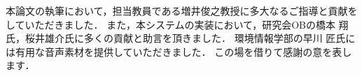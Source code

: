 \begin{acknowledgment}

本論文の執筆において，担当教員である増井俊之教授に多大なるご指導と貢献をしていただきました．
また，本システムの実装において，研究会OBの橋本 翔氏，桜井雄介氏に多くの貢献と助言を頂きました．
環境情報学部の早川 匠氏には有用な音声素材を提供していただきました．
この場を借りて感謝の意を表します．

\end{acknowledgment}
